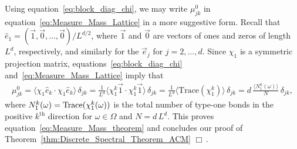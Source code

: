\documentclass{cmslatex}
\begin{document}
Using equation~\eqref{eq:block_diag_chi}, we may write
$\mu^0_{jk}$ in equation~\eqref{eq:Measure_Mass_Lattice} in a more suggestive
form. Recall that $\hat{e}_1=(\vec{1},\vec{0},\ldots,\vec{0})/L^{d/2}$,
where $\vec{1}$ and $\vec{0}$ are vectors of ones and zeros of length
$L^d$, respectively, and similarly for the $\vec{e}_j$ for
$j=2,\ldots,d$. Since $\chi_1$ is a symmetric projection matrix,
equations~\eqref{eq:block_diag_chi}
and~\eqref{eq:Measure_Mass_Lattice} imply that 
%
\begin{align}\label{eq:Measure_Mass_Lattice_Trace}
  \mu^0_{jk}%
       =\langle\chi_1\hat{e}_k\cdot\chi_1\hat{e}_k\rangle\,\delta_{jk}
       =\frac{1}{L^d}\langle\chi_1^k\vec{1}\cdot \chi_1^k\vec{1}\rangle\,\delta_{jk}
       =\frac{1}{L^d}\langle\text{Trace}(\chi_1^k)\rangle\,\delta_{jk}
       =d\,\frac{\langle N_1^k(\omega)\rangle}{N}\,\delta_{jk},       
\end{align}
%
where $N_1^k(\omega)={\rm Trace}(\chi_1^k(\omega))$ is the total number of type-one
bonds in the positive $k^{\text{th}}$ direction for $\omega\in\Omega$ and
$N=d\,L^d$. This proves equation~\eqref{eq:Measure_Mass_theorem} and
concludes our proof of Theorem~\ref{thm:Discrete_Spectral_Theorem_ACM}
$\Box\,$.       
\end{document}
